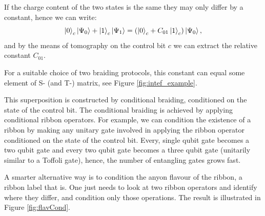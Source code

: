 \documentclass[two column]{article}
\begin{document}
If the charge content of the two states is the same they may only differ by a constant, hence we can write:
\begin{equation}
    \ket{0}_c \ket{\Psi_0} + \ket{1}_c \ket{\Psi_1} = (\ket{0}_c + C_{01}\ket{1}_c)\ket{\Psi_0},
\end{equation}
and by the means of tomography on the control bit $c$ we can extract the relative constant $C_{01}$.

For a suitable choice of two braiding protocols, this constant can equal some element of S- (and T-) matrix, see Figure \ref{fig:intef_example}.

This superposition is constructed by conditional braiding, conditioned on the state of the control bit. 
The conditional braiding is achieved by applying conditional ribbon operators.
For example, we can condition the existence of a ribbon by making any unitary gate involved in applying the ribbon operator conditioned on the state of the control bit.
Every, single qubit gate becomes a two qubit gate and every two qubit gate becomes a three qubit gate (unitarily similar to a Toffoli gate), hence, the number of entangling gates grows fast.

A smarter alternative way is to condition the anyon flavour of the ribbon, a ribbon label that is. One just needs to look at two ribbon operators and identify where they differ, and condition only those operations. The result is illustrated in Figure \ref{fig:flavCond}.
\end{document}
